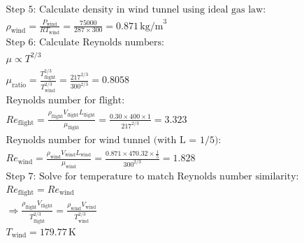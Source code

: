 \begin{homeworkProblem}
\begin{align*}
		\text{Step 5: Calculate density in wind tunnel using ideal gas law:}                                                                                               \\
		\rho_{\text{wind}} = \frac{P_{\text{wind}}}{R T_{\text{wind}}} = \frac{75000}{287 \times 300} = 0.871 \, \text{kg/m}^3                                             \\

		\text{Step 6: Calculate Reynolds numbers:}                                                                                                                         \\
		\mu \propto T^{2/3}                                                                                                                                                \\
		\mu_{\text{ratio}} = \frac{T_{\text{flight}}^{2/3}}{T_{\text{wind}}^{2/3}} = \frac{217^{2/3}}{300^{2/3}} = 0.8058                                                  \\

		\text{Reynolds number for flight:}                                                                                                                                 \\
		Re_{\text{flight}} = \frac{\rho_{\text{flight}} V_{\text{flight}} L_{\text{flight}}}{\mu_{\text{flight}}} = \frac{0.30 \times 400 \times 1}{217^{2/3}} = 3.323     \\

		\text{Reynolds number for wind tunnel (with L = 1/5):}                                                                                                             \\
		Re_{\text{wind}} = \frac{\rho_{\text{wind}} V_{\text{wind}} L_{\text{wind}}}{\mu_{\text{wind}}} = \frac{0.871 \times 470.32 \times \frac{1}{5}}{300^{2/3}} = 1.828 \\

		\text{Step 7: Solve for temperature to match Reynolds number similarity:}                                                                                          \\
		Re_{\text{flight}} = Re_{\text{wind}}                                                                                                                              \\
		\Rightarrow \frac{\rho_{\text{flight}} V_{\text{flight}}}{T_{\text{flight}}^{2/3}} = \frac{\rho_{\text{wind}} V_{\text{wind}}}{T_{\text{wind}}^{2/3}}              \\
		T_{\text{wind}} = 179.77 \, \text{K}                                                                                                                               \\


\end{align*}
\end{homeworkProblem}
